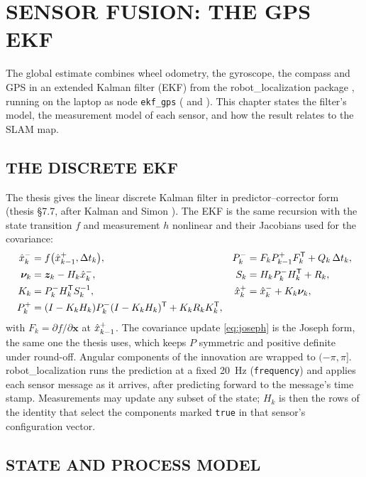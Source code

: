 \chapter{SENSOR FUSION: THE GPS EKF}
\label{ch:fusion}

The global estimate combines wheel odometry, the gyroscope, the compass and
GPS in an extended Kalman filter (EKF) from the robot\_localization package
\cite{moore2014generalized}, running on the laptop as node \texttt{ekf\_gps}
( and ). This
chapter states the filter's model, the measurement model of each sensor, and
how the result relates to the SLAM map.

\section{THE DISCRETE EKF}

The thesis gives the linear discrete Kalman filter in predictor--corrector
form (thesis \S7.7, after Kalman \cite{kalman1960} and Simon
\cite{simon2006optimal}). The EKF is the same recursion with the state
transition $f$ and measurement $h$ nonlinear and their Jacobians used for the
covariance:
\begin{align}
\hat{x}_{k}^- &= f\bigl(\hat{x}_{k-1}^+,\Delta t_k\bigr), &
P_k^- &= F_kP_{k-1}^+F_k^{\mathsf T} + Q_k\,\Delta t_k, \label{eq:ekfpred}\\
\bm\nu_k &= \bm z_k - H_k\hat{x}_k^-, &
S_k &= H_kP_k^-H_k^{\mathsf T} + R_k, \label{eq:ekfinnov}\\
K_k &= P_k^-H_k^{\mathsf T} S_k^{-1}, &
\hat{x}_k^+ &= \hat{x}_k^- + K_k\bm\nu_k, \label{eq:ekfgain}\\
P_k^+ &= (I-K_kH_k)P_k^-(I-K_kH_k)^{\mathsf T} + K_kR_kK_k^{\mathsf T}, \label{eq:joseph}
\end{align}
with $F_k=\partial f/\partial\bm x$ at $\hat{x}_{k-1}^+$. The covariance update
\eqref{eq:joseph} is the Joseph form, the same one the thesis uses, which keeps $P$ symmetric and positive definite under round-off.
Angular components of the innovation are wrapped to $(-\pi,\pi]$.
robot\_localization runs the prediction at a fixed \SI{20}{Hz}
(\texttt{frequency}) and applies each sensor message as it arrives, after
predicting forward to the message's time stamp. Measurements may update any
subset of the state; $H_k$ is then the rows of the identity that select the
components marked \texttt{true} in that sensor's configuration vector.

\section{STATE AND PROCESS MODEL}

